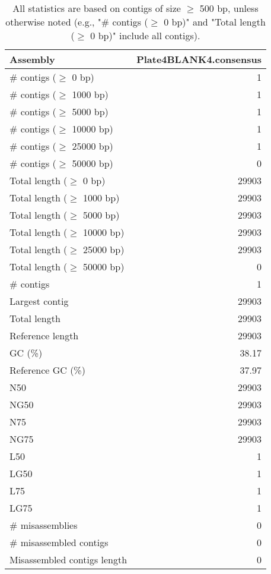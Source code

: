 \documentclass[12pt,a4paper]{article}
\begin{document}
\begin{table}[ht]
\begin{center}
\caption{All statistics are based on contigs of size $\geq$ 500 bp, unless otherwise noted (e.g., "\# contigs ($\geq$ 0 bp)" and "Total length ($\geq$ 0 bp)" include all contigs).}
\begin{tabular}{|l*{1}{|r}|}
\hline
Assembly & Plate4BLANK4.consensus \\ \hline
\# contigs ($\geq$ 0 bp) & 1 \\ \hline
\# contigs ($\geq$ 1000 bp) & 1 \\ \hline
\# contigs ($\geq$ 5000 bp) & 1 \\ \hline
\# contigs ($\geq$ 10000 bp) & 1 \\ \hline
\# contigs ($\geq$ 25000 bp) & 1 \\ \hline
\# contigs ($\geq$ 50000 bp) & 0 \\ \hline
Total length ($\geq$ 0 bp) & 29903 \\ \hline
Total length ($\geq$ 1000 bp) & 29903 \\ \hline
Total length ($\geq$ 5000 bp) & 29903 \\ \hline
Total length ($\geq$ 10000 bp) & 29903 \\ \hline
Total length ($\geq$ 25000 bp) & 29903 \\ \hline
Total length ($\geq$ 50000 bp) & 0 \\ \hline
\# contigs & 1 \\ \hline
Largest contig & 29903 \\ \hline
Total length & 29903 \\ \hline
Reference length & 29903 \\ \hline
GC (\%) & 38.17 \\ \hline
Reference GC (\%) & 37.97 \\ \hline
N50 & 29903 \\ \hline
NG50 & 29903 \\ \hline
N75 & 29903 \\ \hline
NG75 & 29903 \\ \hline
L50 & 1 \\ \hline
LG50 & 1 \\ \hline
L75 & 1 \\ \hline
LG75 & 1 \\ \hline
\# misassemblies & 0 \\ \hline
\# misassembled contigs & 0 \\ \hline
Misassembled contigs length & 0 \\ \hline

\end{tabular}
\end{center}
\end{table}
\end{document}
